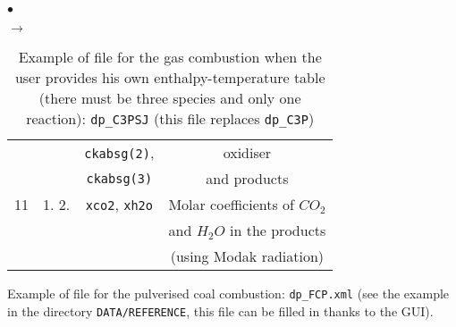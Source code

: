{{{\begin{list}{$\bullet$}{}
\begin{list}{$\rightarrow$}{}
\begin{table}[htbp]
\begin{center}
{\begin{tabular}{|c|c|c|c|}
        &                                   &                  \texttt{ckabsg(2)}, & oxidiser                                    \\
        &                                   &                  \texttt{ckabsg(3)}  & and products                                \\ \hline
  11    &    1.       2.                    & \texttt{xco2\index{xco2}},   \texttt{xh2o\index{xh2o}}& Molar coefficients of $CO_2$         \\
        &                                   &                             & and $H_2O$ in the products                  \\
        &                                   &                             & (using Modak radiation)                     \\ \hline
\end{tabular}
}
\caption{Example of file for the gas combustion when the user provides
 his own enthalpy-temperature table
                     (there must be three species and only one
                     reaction): \texttt{dp\_C3PSJ} (this file replaces
 \texttt{dp\_C3P})}\label{tab:dpC3PSJ}
\end{center}
\end{table}
        \end{list}

       \item Example of file for the pulverised coal combustion:
             \texttt{dp\_FCP.xml} (see the example in the directory \texttt{DATA/REFERENCE},
             this file can be filled in thanks to the GUI).


\end{list}}}}
